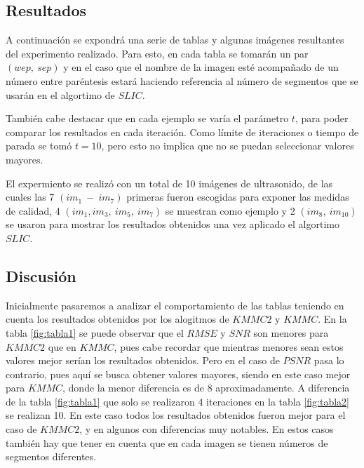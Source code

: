 \documentclass[a4paper,10pt,twocolumn]{article}
\begin{document}
\subsection{Resultados}\label{sec:resultados}

A continuaci\'on se expondr\'a una serie de tablas y algunas im\'agenes resultantes del experimento realizado. Para esto, en cada tabla se tomar\'an un par  $(wep,\ sep)$ y en el caso que el nombre de la imagen est\'e acompa\~nado de un n\'umero entre par\'entesis estar\'a haciendo referencia al n\'umero de segmentos que se usar\'an en el algortimo de $SLIC$. 

Tambi\'en cabe destacar que en cada ejemplo se var\'ia el par\'ametro $t$, para poder comparar los resultados en cada iteraci\'on. Como l\'imite de iteraciones o tiempo de parada se tom\'o $t = 10$, pero esto no implica que no se puedan seleccionar valores mayores.

El expermiento se realiz\'o con un total de 10 im\'agenes de ultrasonido, de las cuales las 7 $(im_1\ -\ im_7)$ primeras fueron escogidas para exponer las medidas de calidad, 4 $(im_1, im_3,\ im_5,\ im_7)$ se muestran como ejemplo y 2 $(im_8,\  im_{10} )$ se usaron para mostrar los resultados obtenidos una vez aplicado el algortimo $SLIC$.


\subsection{Discusi\'{o}n}\label{sec:discusion}

Inicialmente pasaremos a analizar el comportamiento de las tablas teniendo en cuenta los resultados obtenidos por los alogitmos de $KMMC2$ y $KMMC$. En la tabla \ref{fig:tabla1} se puede observar que el $RMSE$ y $SNR$ son menores para $KMMC2$ que en $KMMC$, pues cabe recordar que mientras menores sean estos valores mejor ser\'ian los resultados obtenidos. Pero en el caso de $PSNR$ pasa lo contrario, pues aqu\'i se busca obtener valores mayores, siendo en este caso mejor para $KMMC$, donde la menor diferencia es de 8 aproximadamente. A diferencia de la tabla \ref{fig:tabla1} que solo se realizaron 4 iteraciones en la tabla \ref{fig:tabla2} se realizan 10. En este caso todos los resultados obtenidos fueron mejor para el caso de $KMMC2$, y en algunos con diferencias muy notables. En estos casos tambi\'en hay que tener en cuenta que en cada imagen se tienen n\'umeros de segmentos diferentes.
\end{document}
